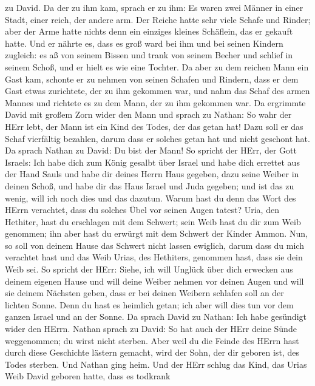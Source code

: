 zu David. Da der zu ihm kam, sprach er zu ihm: Es waren zwei Männer in
einer Stadt, einer reich, der andere arm.  Der Reiche hatte
sehr viele Schafe und Rinder;  aber der Arme hatte nichts
denn ein einziges kleines Schäflein, das er gekauft hatte. Und er nährte
es, dass es groß ward bei ihm und bei seinen Kindern zugleich: es aß von
seinem Bissen und trank von seinem Becher und schlief in seinem Schoß,
und er hielt es wie eine Tochter.  Da aber zu dem reichen
Mann ein Gast kam, schonte er zu nehmen von seinen Schafen und Rindern,
dass er dem Gast etwas zurichtete, der zu ihm gekommen war, und nahm das
Schaf des armen Mannes und richtete es zu dem Mann, der zu ihm gekommen
war.  Da ergrimmte David mit großem Zorn wider den Mann und
sprach zu Nathan: So wahr der HErr lebt, der Mann ist ein Kind des
Todes, der das getan hat!  Dazu soll er das Schaf vierfältig
bezahlen, darum dass er solches getan hat und nicht geschont hat.
 Da sprach Nathan zu David: Du bist der Mann! So spricht der
HErr, der Gott Israels: Ich habe dich zum König gesalbt über Israel und
habe dich errettet aus der Hand Sauls  und habe dir deines
Herrn Haus gegeben, dazu seine Weiber in deinen Schoß, und habe dir das
Haus Israel und Juda gegeben; und ist das zu wenig, will ich noch dies
und das dazutun.  Warum hast du denn das Wort des HErrn
verachtet, dass du solches Übel vor seinen Augen tatest? Uria, den
Hethiter, hast du erschlagen mit dem Schwert; sein Weib hast du dir zum
Weib genommen; ihn aber hast du erwürgt mit dem Schwert der Kinder
Ammon.  Nun, so soll von deinem Hause das Schwert nicht
lassen ewiglich, darum dass du mich verachtet hast und das Weib Urias,
des Hethiters, genommen hast, dass sie dein Weib sei.  So
spricht der HErr: Siehe, ich will Unglück über dich erwecken aus deinem
eigenen Hause und will deine Weiber nehmen vor deinen Augen und will sie
deinem Nächsten geben, dass er bei deinen Weibern schlafen soll an der
lichten Sonne.  Denn du hast es heimlich getan; ich aber
will dies tun vor dem ganzen Israel und an der Sonne.  Da
sprach David zu Nathan: Ich habe gesündigt wider den HErrn. Nathan
sprach zu David: So hat auch der HErr deine Sünde weggenommen; du wirst
nicht sterben.  Aber weil du die Feinde des HErrn hast
durch diese Geschichte lästern gemacht, wird der Sohn, der dir geboren
ist, des Todes sterben.  Und Nathan ging heim. Und der HErr
schlug das Kind, das Urias Weib David geboren hatte, dass es todkrank
